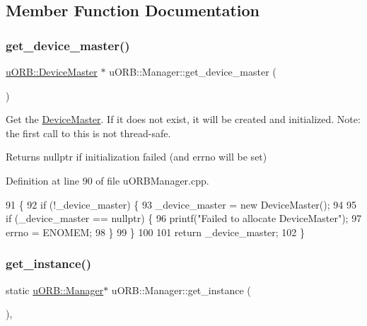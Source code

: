 \subsection{Member Function Documentation}
\mbox{\label{classuORB_1_1Manager_a083331e24ac4f99ac11a0aab1b1681b4}} 
\subsubsection{\texorpdfstring{get\+\_\+device\+\_\+master()}{get\_device\_master()}}
{\footnotesize\ttfamily \hyperlink{classuORB_1_1DeviceMaster}{u\+O\+R\+B\+::\+Device\+Master} $\ast$ u\+O\+R\+B\+::\+Manager\+::get\+\_\+device\+\_\+master (\begin{DoxyParamCaption}{ }\end{DoxyParamCaption})}

Get the \hyperlink{classuORB_1_1DeviceMaster}{Device\+Master}. If it does not exist, it will be created and initialized. Note\+: the first call to this is not thread-\/safe. \begin{DoxyReturn}{Returns}
nullptr if initialization failed (and errno will be set) 
\end{DoxyReturn}


Definition at line 90 of file u\+O\+R\+B\+Manager.\+cpp.


\begin{DoxyCode}
91 \{
92     \textcolor{keywordflow}{if} (!\_device\_master) \{
93         \_device\_master = \textcolor{keyword}{new} DeviceMaster();
94 
95         \textcolor{keywordflow}{if} (\_device\_master == \textcolor{keyword}{nullptr}) \{
96             printf(\textcolor{stringliteral}{"Failed to allocate DeviceMaster"});
97             errno = ENOMEM;
98         \}
99     \}
100 
101     \textcolor{keywordflow}{return} \_device\_master;
102 \}
\end{DoxyCode}
\mbox{\label{classuORB_1_1Manager_a9d829b3ea49d16d03c2fa37ef2bb24a5}} 
\subsubsection{\texorpdfstring{get\+\_\+instance()}{get\_instance()}}
{\footnotesize\ttfamily static \hyperlink{classuORB_1_1Manager}{u\+O\+R\+B\+::\+Manager}$\ast$ u\+O\+R\+B\+::\+Manager\+::get\+\_\+instance (\begin{DoxyParamCaption}{ }\end{DoxyParamCaption})\hspace{0.3cm}{\ttfamily [inline]}, {\ttfamily [static]}}

